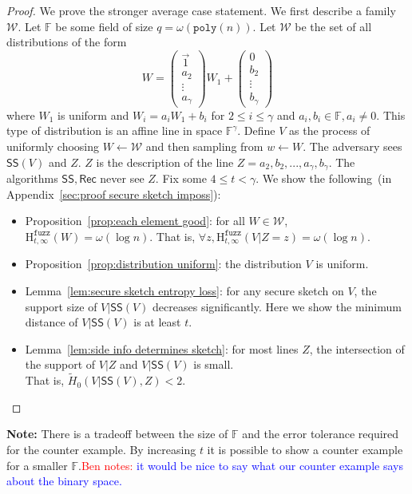 \documentclass[11pt]{article}
\newcommand{\apref}[1]{\mbox{Appendix~\ref{#1}}}
\newcommand{\lemref}[1]{\mbox{Lemma~\ref{#1}}}
\newcommand{\propref}[1]{\mbox{Proposition~\ref{#1}}}
\newcommand{\class}[1]{{\ensuremath{\mathsf{#1}}}}
\newcommand{\sketch}{\ensuremath{\class{SS}}\xspace}
\newcommand{\rec}{\ensuremath{\class{Rec}}\xspace}
\newcommand{\poly}{\ensuremath{\mathtt{poly}}\xspace}
\newcommand{\Hfuzz}{\mathrm{H}^{\mathtt{fuzz}}_{t,\infty}}
\newcommand{\authnote}[2]{{\textcolor{red}{\textsf{#1 notes: }\textcolor{blue}{ #2}}\marginpar{\textcolor{red}{\textbf{!!!!!}}}}}
\newcommand{\authnote}[2]{}
\newcommand{\bnote}[1]{{\authnote{Ben}{#1}}}
\begin{document}
\begin{proof}
We prove the stronger average case statement.
We first describe a family $\mathcal{W}$.  Let $\mathbb{F}$ be some field of size $q =\omega(\poly(n))$.  
Let $\mathcal{W}$ be the set of all distributions of the form 
\[W =  \begin{pmatrix} \vec{1} \\a_2  \\ \vdots \\ a_{\gamma} \end{pmatrix} W_1 + \begin{pmatrix} 0  \\ 
b_2\\ \vdots \\ b_{\gamma} \end{pmatrix} 
\]
where $W_1$ is uniform and $W_i = a_i W_1 + b_i$ for $2\le i \le \gamma$ and $a_i, b_i\in\mathbb{F}, a_i\neq 0$.  
This type of distribution is an affine line in space $\mathbb{F}^\gamma$.  Define $V$ as the process of uniformly choosing $W\leftarrow \mathcal{W}$ and then sampling from $w\leftarrow W$.  The adversary sees $\sketch(V)$ and $Z$.  $Z$ is the description of the line $Z = a_2, b_2, ..., a_\gamma, b_\gamma$. The algorithms $\sketch, \rec$ never see $Z$.
Fix some $4\le t < \gamma$.
We show the following~(in \apref{sec:proof secure sketch imposs}):

\begin{itemize}
\item \propref{prop:each element good}: for all $W\in \mathcal{W}$, $\Hfuzz(W) = \omega (\log n)$. That is, $\forall z, \Hfuzz(V | Z=z) = \omega(\log n)$.
\item \propref{prop:distribution uniform}: the distribution $V$ is uniform.
\item \lemref{lem:secure sketch entropy loss}: for any secure sketch on $V$, the support size of $V | \sketch(V)$ decreases significantly.  Here we show the minimum distance of $V|\sketch(V)$ is at least $t$.
\item \lemref{lem:side info determines sketch}:  for most lines $Z$, the intersection of the support of $V|Z$ and $V | \sketch(V)$ is small.  \\That is, $\tilde{H}_0(V | \sketch(V), Z) < 2$.
\end{itemize}
\end{proof}
\noindent
\textbf{Note:} There is a tradeoff between the size of $\mathbb{F}$ and the error tolerance required for the counter example.  By increasing $t$ it is possible to show a counter example for a smaller $\mathbb{F}$.\bnote{it would be nice to say what our counter example says about the binary space.}
\end{document}

